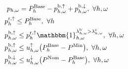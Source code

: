 \documentclass[11pt,a4paper]{article}
\begin{document}
\begin{subequations}
\begin{align}
           & \ p_{h,\omega} = P^{\rm{Base}}_{h} - p^{\rm{b}, \uparrow}_{h,\omega} + p^{\rm{b}, \downarrow}_{h,\omega}, \                                                                                                  \forall{h,\omega}                                                                             \label{power:6}                                                                                                                                                                                                                           \\
        \  & p^{\rm{r}, \uparrow}_h \leq P^{\rm{Base}}_h,
        \                                                                                                                                                        \forall{h}                                                                                     \label{power:7}                                                                                                                                                                                                                                                                                   \\
        \  & p^{\rm{b}, \uparrow}_{h,\omega} \leq p^{\rm{r}, \uparrow}_h \mathbbm{1}_{h,\omega}^{\lambda^{\rm{b}}_{h,\omega} > \lambda^{\rm{s}}_{h,\omega}} , \                                                                            \forall{h,\omega}                                                                             \label{power:8}                                                                                                                                                                                                          \\
        \  & p^{\rm{b}, \uparrow}_{h,\omega} \leq u_{h,\omega}^{\uparrow} \big(P^{\rm{Base}}_{h} - P^{\rm{Min}}\big) , \                                                                                                       \forall{h,\omega}                                                                             \label{power:9}                                                                                                                                                                                                                      \\
        \  & p^{\rm{b}, \downarrow}_{h,\omega} \leq u^{\downarrow}_{h,\omega} \big(P^{\rm{Nom}} -P^{\rm{Base}}_{h}\big), \                                                                                              \forall{h,\omega}                                                                             \label{power:10}                                                                                                                                                                                                                            \\

\end{align}
\end{subequations}
\end{document}
